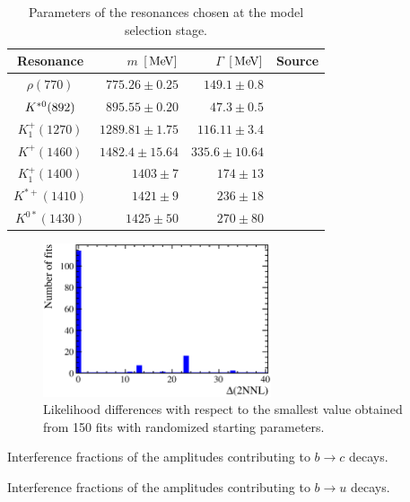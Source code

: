 \begin{table}[h]
\centering
\caption{Parameters of the resonances chosen at the model selection stage.}
\begin{tabular}{c r r c}
\hline \hline
Resonance & $m$ $[\mathrm{\,Me\kern -0.1em V}]$ & $\Gamma$ $[\mathrm{\,Me\kern -0.1em V}]$ & Source \\
\hline
$\rho(770)$ & $775.26 \pm 0.25$ & $149.1 \pm 0.8$ & ~\cite{PDG2016}\\
${{K}^{*0}}(892)$ & $895.55 \pm 0.20$ & $47.3 \pm 0.5$ & ~\cite{PDG2016}\\
$K^{+}_{1}(1270)$ & $1289.81 \pm 1.75$ & $116.11 \pm 3.4$ & ~\cite{Aaij:2017kbo}\\
$K^{+}(1460)$ & $1482.4 \pm 15.64 $ & $335.6  \pm 10.64$ & ~\cite{Aaij:2017kbo}\\
$K^{+}_{1}(1400)$ & $1403 \pm 7$ & $174 \pm 13$ & ~\cite{PDG2016} \\
$K^{*+}(1410)$ & $1421 \pm 9$ & $236 \pm 18$ & ~\cite{PDG2016}\\
$K^{0*}(1430)$ & $1425 \pm 50$ & $270 \pm 80$ & ~\cite{PDG2016}\\
\hline \hline
\end{tabular}
		\label{tab:resoParam}
\end{table}
\begin{figure}[h]
	\centering
		\includegraphics[width=0.6\textwidth, height = !]{figs/fullFit/scanNLL.eps} 

		\caption{Likelihood differences with respect to the smallest value obtained from 150 fits with randomized starting parameters.} 		
		\label{fig:scanLL}
\end{figure}



\begin{table}[h]
\centering
\caption{
Interference fractions of the amplitudes contributing to $b \to c$ decays.
}
	\renewcommand{\arraystretch}{1.5}
	
\label{tab:fullFractionsInt}
\end{table}


\begin{table}[h]
\centering
\caption{
Interference fractions of the amplitudes contributing to $b \to u$ decays.
}
	\renewcommand{\arraystretch}{1.5}
	
\label{tab:fullFractionsIntBar}
\end{table}







